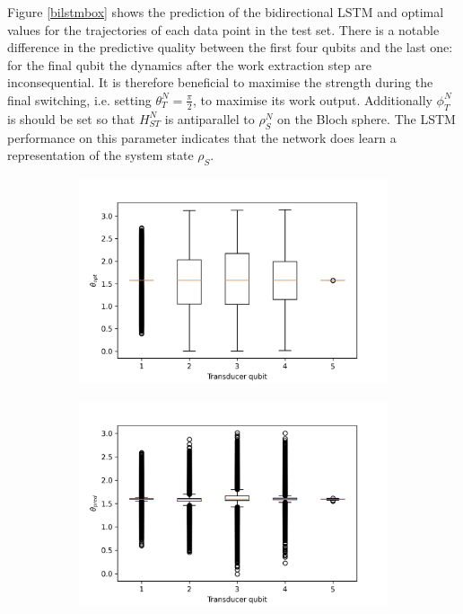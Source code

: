Figure \ref{bilstmbox} shows the prediction of the bidirectional LSTM and optimal values for the trajectories of each data point in the test set.
There is a notable difference in the predictive quality between the first four qubits and the last one: for the final qubit the dynamics after the work extraction step are inconsequential.
It is therefore beneficial to maximise the strength during the final switching, i.e. setting $\theta_T^N = \frac{\pi}{2}$, to maximise its work output.
Additionally $\phi_T^N$ is should be set so that $H_{ST}^N$ is antiparallel to $\rho_S^N$ on the Bloch sphere.
The LSTM performance on this parameter indicates that the network does learn a representation of the system state $\rho_S$.


\begin{figure}
	\centering
	\begin{subfigure}{0.32\textwidth}
		\centering
		\includegraphics[width=\textwidth]{img/theta_opt_box}
	\end{subfigure}
	\begin{subfigure}{0.32\textwidth}
		\centering
		\includegraphics[width=\textwidth]{img/theta_pred_box}

\end{subfigure}
\end{figure}
